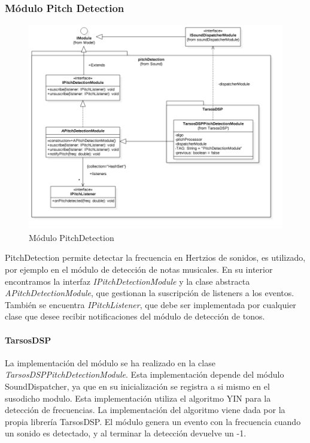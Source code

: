 \subsubsection{Módulo Pitch Detection}
\begin{figure}
	\centering
	\includegraphics[width=1\linewidth]{imagenes/diagramas/PitchDetectionModule.png}
	\caption{Módulo PitchDetection}
	\label{fig:pitch-detection-module}
\end{figure}
PitchDetection permite detectar la frecuencia en Hertzios de sonidos, es utilizado, por ejemplo en el módulo de detección de notas musicales.
En su interior encontramos la interfaz \textit{IPitchDetectionModule} y la clase abstracta \textit{APitchDetectionModule}, que gestionan la suscripción de listeners a los eventos. También se encuentra \textit{IPitchListener}, que debe ser implementada por cualquier clase que desee recibir notificaciones del módulo de detección de tonos.

\paragraph*{TarsosDSP \\}
La implementación del módulo se ha realizado en la clase \textit{TarsosDSPPitchDetectionModule}. Esta implementación depende del módulo SoundDispatcher, ya que en su inicialización se registra a si mismo en el susodicho modulo.
Esta implementación utiliza el algoritmo YIN \cite{de_YINa_f2002} para la detección de frecuencias. La implementación del algoritmo viene dada por la propia librería TarsosDSP. El módulo genera un evento con la frecuencia cuando un sonido es detectado, y al terminar la detección devuelve un -1.

